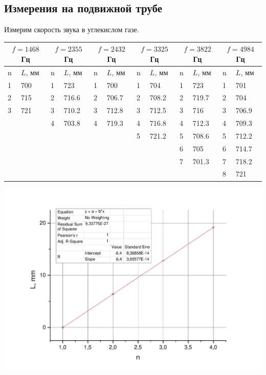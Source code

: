 \documentclass[a4paper,12pt]{article}
\begin{document}
		\subsection{Измерения на подвижной трубе}
		Измерим скорость звука в углекислом газе.
		\begin{center}
			\begin{tabular}{ l | l | l | l | l | l | l | l | l | l | l | l }
				\multicolumn{2}{|c}{$f=1468$ Гц} & \multicolumn{2}{|c}{$f=2355$ Гц} & \multicolumn{2}{|c}{$f=2432$ Гц} & \multicolumn{2}{|c}{$f=3325$ Гц}& \multicolumn{2}{|c}{$f=3822$ Гц}& \multicolumn{2}{|c}{$f=4984$ Гц}\\ \hline
				n & $L$, мм & n & $L$, мм & n & $L$, мм & n & $L$, мм & n & $L$, мм & n & $L$, мм \\ \hline
				1 & 700 & 1 & 723 & 1 & 700  & 1 & 704 & 1 & 723 & 1 & 701  \\ \hline
				2 & 715 & 2 & 716.6 & 2 & 706.7 & 2 & 708.2 & 2 & 719.7 & 2 & 704  \\ \hline
				3 & 721 & 3 & 710.2 & 3 & 712.8 & 3 & 712.5 & 3 & 716 & 3 & 706.9  \\ \hline
				  &     & 4 & 703.8 & 4 & 719.3 & 4 & 716.8 & 4 & 712.3 & 4 & 709.3  \\ \hline
				  &     &   &       &   &       & 5 & 721.2 & 5 & 708.6 & 5 & 712.2 \\ \hline
			      &     &   &       &   &       &   &       & 6 & 705 & 6 & 714.7   \\ \hline
			      &     &   &       &   &       &   &       & 7  & 701.3 & 7 & 718.2   \\ \hline
				  &     &   &       &   &       &   &       &    &       & 8 & 721   \\ \hline
			\end{tabular}
		\end{center}
		
		
		\includegraphics[width = 0.9\linewidth]{Graph1co2}
		
\end{document}
